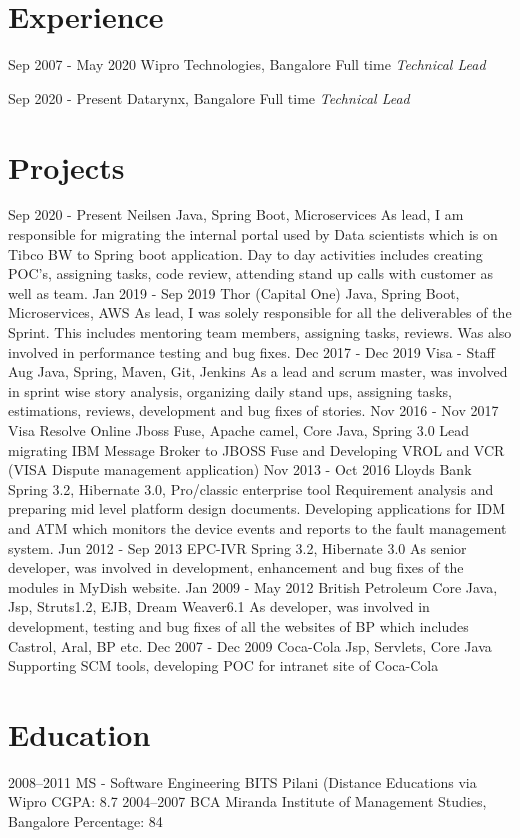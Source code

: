 \documentclass[]{kartikkumar-cv}
\begin{document}
\section{Experience}
\begin{entrylist}
	\entry
	{Sep 2007 - May 2020} 
	{ Wipro Technologies, Bangalore}
	{Full time}
	{\emph{Technical Lead}}
	
	\entry
	{Sep 2020 - Present}
	{Datarynx, Bangalore}
	{Full time}
	{\emph{Technical Lead}}
  \end{entrylist}

\section{Projects}

\begin{entrylist}
	\entry		
	{Sep 2020 - Present}
	{Neilsen}
	{Java, Spring Boot, Microservices}
	{As lead, I am responsible for migrating the internal portal used by Data scientists which is on Tibco BW to Spring boot application. Day to day activities includes creating POC's, assigning tasks, code review, attending stand up calls with customer as well as team.}
	\entry		
	{Jan 2019 - Sep 2019}
	{Thor (Capital One)}
	{Java, Spring Boot, Microservices, AWS}
	{As lead, I was solely responsible for all the deliverables of the Sprint. This includes mentoring team members, assigning tasks, reviews. Was also involved in performance testing and bug fixes.}
    \entry
    {Dec 2017 - Dec 2019}
    {Visa - Staff Aug}
    {Java, Spring, Maven, Git, Jenkins}
    {As a lead and scrum master, was involved in sprint wise story analysis, organizing daily stand ups, assigning tasks, estimations, reviews, development and bug fixes of stories. }
    \entry
    {Nov 2016 - Nov 2017}
    {Visa Resolve Online}
    {Jboss Fuse, Apache camel, Core Java, Spring 3.0}
    {Lead migrating IBM Message Broker to JBOSS Fuse and Developing VROL and VCR (VISA Dispute management application)}
     \entry
    {Nov 2013 - Oct 2016}
    {Lloyds Bank}
    {Spring 3.2, Hibernate 3.0, Pro/classic enterprise tool}
    {Requirement analysis and preparing mid level platform design documents. Developing applications for IDM and ATM which monitors the device events and reports to the fault management system.}  
    \entry
    {Jun 2012 - Sep 2013}
    {EPC-IVR}
    {Spring 3.2, Hibernate 3.0}
    {As senior developer, was involved in development, enhancement and bug fixes of the modules in MyDish website.} 
    \entry
    {Jan 2009 - May 2012}
    {British Petroleum}
    {Core Java, Jsp, Struts1.2, EJB, Dream Weaver6.1}
    {As developer, was involved in development, testing and bug fixes of all the websites of BP which includes Castrol, Aral, BP etc.}
    \entry
    {Dec 2007 - Dec 2009}
    {Coca-Cola}
    {Jsp, Servlets, Core Java}
    {Supporting SCM tools, developing POC for intranet site of Coca-Cola}
\end{entrylist}

\section{Education}

\begin{entrylist}
\entry
    {2008–2011}
    {MS - Software Engineering }
    {BITS Pilani (Distance Educations via Wipro}
    {CGPA: 8.7}
  \entry
    {2004–2007}
    {BCA }
    {Miranda Institute of Management Studies, Bangalore}
    {Percentage: 84} 
\end{entrylist}
\end{document}
